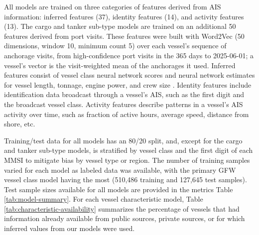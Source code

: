 \documentclass[lineno,pdflatex,sn-nature]{sn-jnl}
\begin{document}
All models are trained on three categories of features derived from AIS information: inferred features (37), identity features (14), and activity features (13). The cargo and tanker sub-type models are trained on an additional 50 features derived from port visits. These features were built with Word2Vec (50 dimensions, window 10, minimum count 5) over each vessel's sequence of anchorage visits, from high-confidence port visits in the 365 days to 2025-06-01; a vessel's vector is the visit-weighted mean of the anchorages it used. Inferred features consist of vessel class neural network scores and neural network estimates for vessel length, tonnage, engine power, and crew size \cite{kroodsma2018tracking}. Identity features include identification data broadcast through a vessel's AIS, such as the first digit and the broadcast vessel class. Activity features describe patterns in a vessel's AIS activity over time, such as fraction of active hours, average speed, distance from shore, etc.

Training/test data for all models has an 80/20 split, and, except for the cargo and tanker sub-type models, is stratified by vessel class and the first digit of each MMSI to mitigate bias by vessel type or region. The number of training samples varied for each model as labeled data was available, with the primary GFW vessel class model having the most (510,486 training and 127,645 test samples). Test sample sizes available for all models are provided in the metrics Table \ref{tab:model-summary}. For each vessel characteristic model, Table \ref{tab:characteristic-availability} summarizes the percentage of vessels that had information already available from public sources, private sources, or for which inferred values from our models were used. 
\end{document}
